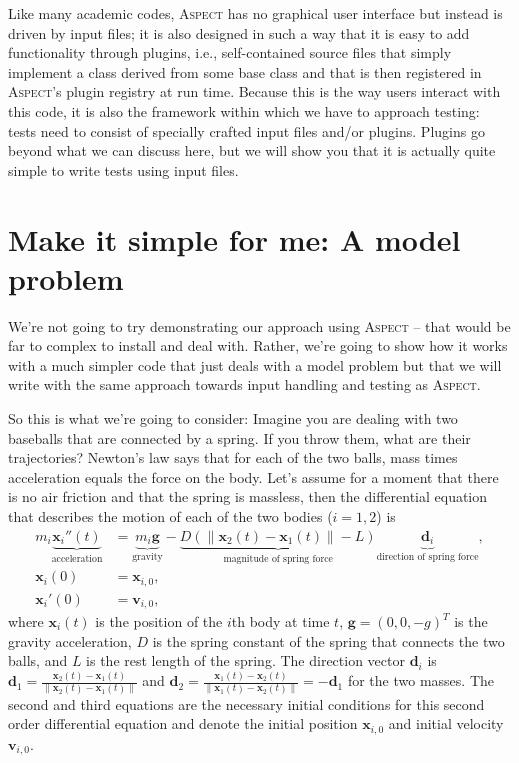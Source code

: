 \documentclass{article}
\newcommand{\aspect}{\textsc{Aspect}}
\begin{document}
Like many academic codes, \aspect{} has no graphical user interface but
instead is driven by input files; it is also designed in such a way that it is
easy to add functionality through plugins, i.e., self-contained source files
that simply implement a class derived from some base class and that is then
registered in \aspect{}'s plugin registry at run time. Because this is the way
users interact with this code, it is also the framework within which we have
to approach testing: tests need to consist of specially crafted input files
and/or plugins. Plugins go beyond what we can discuss here, but we will show
you that it is actually quite simple to write tests using input files.


\section{Make it simple for me: A model problem}
\label{sec:model-problem}

We're not going to try demonstrating our approach using \aspect{} -- that
would be far to complex to install and deal with. Rather, we're going to show
how it works with a much simpler code that just deals with a model problem but
that we will write with the same approach towards input handling and testing
as \aspect{}.

So this is what we're going to consider: Imagine you are dealing with two
baseballs that
are connected by a spring. If you throw them, what are their trajectories?
Newton's law says that for each of the two balls, mass times acceleration
equals the force on the body. Let's assume for a moment that there is no air
friction and that the spring is massless, then the differential equation that
describes the motion of each of the two bodies ($i=1,2$) is
\begin{align}
  \label{eq:ode}
  m_i 
  \underbrace{\mathbf x_i''(t)}_{\text{acceleration}}
  &=
  \underbrace{m_i \mathbf g}_{\text{gravity}}
  -
  \underbrace{D (\|\mathbf x_2(t) - \mathbf x_1(t)\| - L)}_{\text{magnitude of
    spring force}}
\underbrace{\mathbf d_i}_{\text{direction of spring force}},
\\
\label{eq:ic1}
  \mathbf x_i(0) &= \mathbf x_{i,0},
\\
\label{eq:ic2}
  \mathbf x_i'(0) &= \mathbf v_{i,0},
\end{align}
where $\mathbf x_i(t)$ is the position of the $i$th body at time $t$, $\mathbf
g=(0,0,-g)^T$ is the gravity acceleration, $D$ is the spring constant of
the spring that connects the two balls, and $L$ is the rest length of the
spring. The direction vector $\mathbf d_i$ is
$\mathbf d_1 = \frac{\mathbf x_2(t) - \mathbf x_1(t)}{\|\mathbf x_2(t) - \mathbf
    x_1(t)\|}$
and
$\mathbf d_2 = \frac{\mathbf x_1(t) - \mathbf x_2(t)}{\|\mathbf x_1(t) - \mathbf
    x_2(t)\|}=-\mathbf d_1$ for the two masses.
The second and third equations are the necessary initial conditions
for this second order differential equation and denote the initial position
$\mathbf x_{i,0}$ and initial velocity $\mathbf v_{i,0}$.
\end{document}
